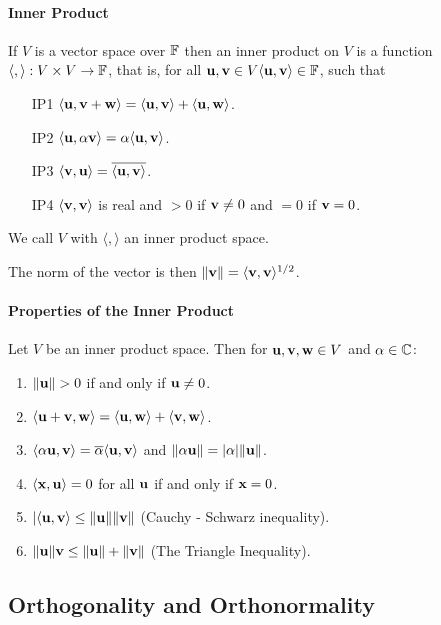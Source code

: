 \paragraph{Inner Product}
If \(V\) is a vector space over \(\mathbb{F}\) then an inner product on \(V\) is a function \(\langle,\rangle: V \times V \to \mathbb{F}\), that is, for all \(\mathbf{u}, \mathbf{v} \in V \langle\mathbf{u}, \mathbf{v} \rangle \in \mathbb{F}\), such that
\begin{itemize}
    \item [IP1] \(\langle \mathbf{u}, \mathbf{v} + \mathbf{w} \rangle = \langle \mathbf{u}, \mathbf{v} \rangle + \langle \mathbf{u}, \mathbf{w} \rangle\).
    \item [IP2] \(\langle \mathbf{u}, \alpha\mathbf{v} \rangle = \alpha\langle \mathbf{u}, \mathbf{v} \rangle\).
    \item [IP3] \(\langle \mathbf{v}, \mathbf{u} \rangle = \overline{\langle \mathbf{u}, \mathbf{v} \rangle}\).
    \item [IP4] \(\langle \mathbf{v}, \mathbf{v} \rangle\) is real and \(> 0\) if \(\mathbf{v} \neq 0\) and \(= 0\) if \(\mathbf{v} = 0\).
\end{itemize}
We call \(V\) with \(\langle , \rangle\) an inner product space.

The norm of the vector is then \(\norm{\mathbf{v}} = \langle \mathbf{v}, \mathbf{v} \rangle^{1/2}\).

\paragraph{Properties of the Inner Product}
Let \(V\) be an inner product space. Then for \(\mathbf{u}, \mathbf{v}, \mathbf{w} \in V\) and \(\alpha \in \mathbb{C}\):
\begin{enumerate}
    \item \(\norm{\mathbf{u}} > 0\) if and only if \(\mathbf{u} \neq 0\).
    \item \(\langle \mathbf{u} + \mathbf{v}, \mathbf{w} \rangle = \langle \mathbf{u}, \mathbf{w} \rangle + \langle \mathbf{v}, \mathbf{w} \rangle\).
    \item \(\langle \alpha\mathbf{u}, \mathbf{v} \rangle = \overline{\alpha}\langle \mathbf{u}, \mathbf{v} \rangle\) and \(\norm{\alpha\mathbf{u}} = |\alpha|\norm{\mathbf{u}}\).
    \item \(\langle \mathbf{x}, \mathbf{u} \rangle = 0\) for all \(\mathbf{u}\) if and only if \(\mathbf{x} = 0\).
    \item \(|\langle \mathbf{u}, \mathbf{v} \rangle \leq \norm{\mathbf{u}}\norm{\mathbf{v}}\) (Cauchy - Schwarz inequality).
    \item \(\norm{\mathbf{u}}{\mathbf{v}} \leq \norm{\mathbf{u}} + \norm{\mathbf{v}}\) (The Triangle Inequality).
\end{enumerate}

\subsection{Orthogonality and Orthonormality}
